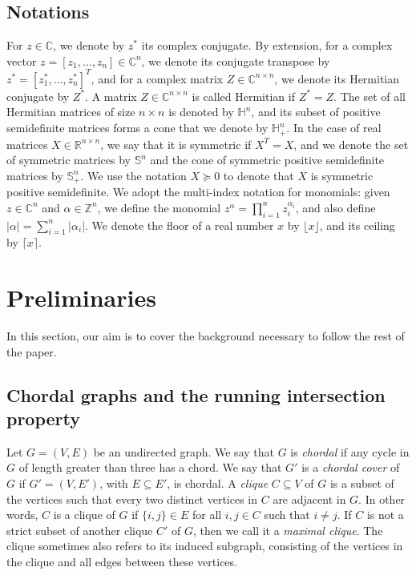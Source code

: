 \documentclass{article}
\newcommand{\ZZ}{\mathbb{Z}}
\newcommand{\RR}{\mathbb{R}}
\newcommand{\CC}{\mathbb{C}}
\theoremstyle{definition}
\begin{document}
\subsection{Notations}
For $z \in \CC$, we denote by $z^*$ its complex conjugate. By extension, for a complex vector $z = [z_1,\dots, z_n]\in \CC^n$, we denote its conjugate transpose by $z^* = [z_1^*,\dots,z_n^*]^T$, and for a complex matrix $ Z \in \CC^{n\times n}$, we denote its Hermitian conjugate by $Z^*$. A matrix $Z \in \CC^{n\times n}$ is called Hermitian if $Z^* = Z$. The set of all Hermitian matrices of size $n\times n$ is denoted by $\mathbb{H}^n$, and its subset of positive semidefinite matrices forms a cone that we denote by $\mathbb{H}^n_+$. In the case of real matrices $X \in \RR^{n \times n}$, we say that it is symmetric if $X^T = X$, and we denote the set of symmetric matrices by $\mathbb{S}^n$ and the cone of symmetric positive semidefinite matrices by $\mathbb{S}^n_+$. We use the notation $X \succeq 0$ to denote that $X$ is symmetric positive semidefinite.  We adopt the multi-index notation for monomials: given $z \in \CC^n$ and $\alpha \in \ZZ^n$, we define the monomial $z^\alpha = \prod_{i=1}^n z_i^{\alpha_i}$, and also define $|\alpha| = \sum_{i=1}^n |\alpha_i|$. We denote the floor of a real number $x$ by $\lfloor x\rfloor$, and its ceiling by $\lceil x\rceil$.\\

\section{Preliminaries}\label{sec:preliminaries}
In this section, our aim is to cover the background necessary to follow the rest of the paper.  

\subsection{Chordal graphs and the running intersection property}
Let $G = (V,E)$ be an undirected graph. We say that $G$ is \emph{chordal} if any cycle in $G$ of length greater than three has a chord. We say that $G'$ is a \emph{chordal cover} of $G$ if $G' = (V,E')$, with $E \subseteq E'$, is chordal. A \emph{clique} $C \subseteq V$ of $G$ is a subset of the vertices such that every two distinct vertices in $C$ are adjacent in $G$. In other words, $C$ is a clique of $G$ if $\{i,j\} \in E$ for all $i,j \in C$ such that $i \neq j$. If $C$ is not a strict subset of another clique $C'$ of $G$, then we call it a \emph{maximal clique}. The clique sometimes also refers to its induced subgraph, consisting of the vertices in the clique and all edges between these vertices. 
\end{document}
